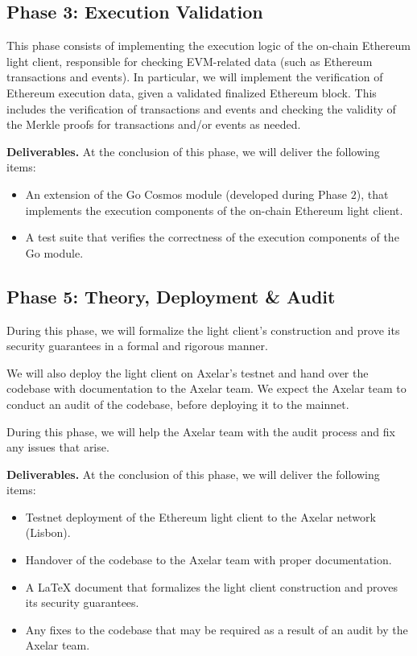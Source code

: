\subsection{Phase 3: Execution Validation}

This phase consists of implementing the execution logic of the on-chain Ethereum light client, responsible for checking EVM-related data (such as Ethereum transactions and events). In particular, we will implement the verification of Ethereum execution data, given a validated finalized Ethereum block. This includes the verification of transactions and events and checking the validity of the Merkle proofs for transactions and/or events as needed.

\noindent
\textbf{Deliverables.} At the conclusion of this phase, we will deliver the following items:

\begin{itemize}
    \item An extension of the Go Cosmos module (developed during Phase $2$), that implements the execution components of the on-chain Ethereum light client.
    \item A test suite that verifies the correctness of the execution components of the Go module.
\end{itemize}

\subsection{Phase 5: Theory, Deployment \& Audit}

During this phase, we will formalize the light client's construction and prove its security guarantees in a formal and rigorous manner.

We will also deploy the light client on Axelar's testnet and hand over the codebase with documentation to the Axelar team. We expect the Axelar team to conduct an audit of the codebase, before deploying it to the mainnet.

During this phase, we will help the Axelar team with the audit process and fix any issues that arise.

\noindent
\textbf{Deliverables.} At the conclusion of this phase, we will deliver the following items:
\begin{itemize}
  \item Testnet deployment of the Ethereum light client to the Axelar network (Lisbon).
  \item Handover of the codebase to the Axelar team with proper documentation.
  \item A LaTeX document that formalizes the light client construction and proves its security guarantees.
  \item Any fixes to the codebase that may be required as a result of an audit by the Axelar team.
\end{itemize}
